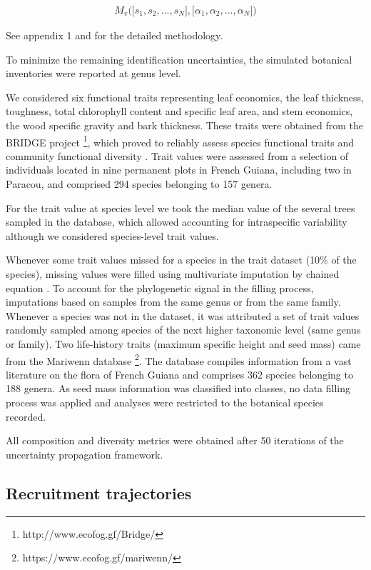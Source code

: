 \documentclass[fleqn,10pt]{ArtEcoFoG} %
\begin{document}
\begin{align}
M_v\Big(\big[s_1, s_2,..., s_N\big],\big[\alpha_1, \alpha_2,..., \alpha_N\big]\Big) \nonumber
\end{align}

See appendix 1 and \citet{Aubry-Kientz2013} for the detailed
methodology.

To minimize the remaining identification uncertainties, the simulated
botanical inventories were reported at genus level.

We considered six functional traits representing leaf economics, the
leaf thickness, toughness, total chlorophyll content and specific leaf
area, and stem economics, the wood specific gravity and bark thickness.
These traits were obtained from the BRIDGE project \footnote{http://www.ecofog.gf/Bridge/},
which proved to reliably assess species functional traits and community
functional diversity \citep{Paine2015}. Trait values were assessed from
a selection of individuals located in nine permanent plots in French
Guiana, including two in Paracou, and comprised 294 species belonging to
157 genera.

\color{red} For the trait value at species level we took the median
value of the several trees sampled in the database, which allowed
accounting for intraspecific variability although we considered
species-level trait values. \color{black}

Whenever some trait values missed for a species in the trait dataset
(10\% of the species), missing values were filled using multivariate
imputation by chained equation \citep{Mice2011}. To account for the
phylogenetic signal in the filling process, imputations based on samples
from the same genus or from the same family. Whenever a species was not
in the dataset, it was attributed a set of trait values randomly sampled
among species of the next higher taxonomic level (same genus or family).
Two life-history traits (maximum specific height and seed mass) came
from the Mariwenn database \footnote{https://www.ecofog.gf/mariwenn/}.
The database compiles information from a vast literature on the flora of
French Guiana \citep{Ollivier2007} and comprises 362 species belonging
to 188 genera. As seed mass information was classified into classes, no
data filling process was applied and analyses were restricted to the
botanical species recorded.

All composition and diversity metrics were obtained after 50 iterations
of the uncertainty propagation framework.

\subsection{Recruitment trajectories}\label{recruitment-trajectories}
\end{document}
